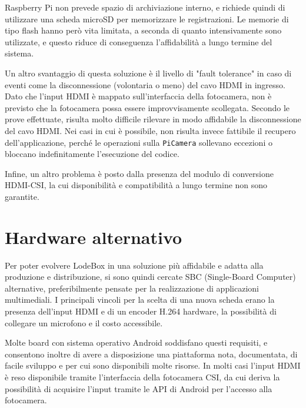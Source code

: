 
Raspberry Pi non prevede spazio di archiviazione interno, e richiede quindi di utilizzare una scheda microSD per memorizzare le registrazioni. Le memorie di tipo flash hanno però vita limitata, a seconda di quanto intensivamente sono utilizzate, e questo riduce di conseguenza l'affidabilità a lungo termine del sistema.

Un altro svantaggio di questa soluzione è il livello di "fault tolerance" in caso di eventi come la disconnessione (volontaria o meno) del cavo HDMI in ingresso. Dato che l'input HDMI è mappato sull'interfaccia della fotocamera, non è previsto che la fotocamera possa essere improvvisamente scollegata. Secondo le prove effettuate, risulta molto difficile rilevare in modo affidabile la disconnessione del cavo HDMI. Nei casi in cui è possibile, non risulta invece fattibile il recupero dell'applicazione, perché le operazioni sulla \texttt{PiCamera} sollevano eccezioni o bloccano indefinitamente l'esecuzione del codice.

Infine, un altro problema è posto dalla presenza del modulo di conversione HDMI-CSI, la cui disponibilità e compatibilità a lungo termine non sono garantite.

\section{Hardware alternativo}
\label{sec:intro_hardware}

Per poter evolvere LodeBox in una soluzione più affidabile e adatta alla produzione e distribuzione, si sono quindi cercate SBC (Single-Board Computer) alternative, preferibilmente pensate per la realizzazione di applicazioni multimediali. I principali vincoli per la scelta di una nuova scheda erano la presenza dell'input HDMI e di un encoder H.264 hardware, la possibilità di collegare un microfono e il costo accessibile.

Molte board con sistema operativo Android soddisfano questi requisiti, e consentono inoltre di avere a disposizione una piattaforma nota, documentata, di facile sviluppo e per cui sono disponibili molte risorse. In molti casi l'input HDMI è reso disponibile tramite l'interfaccia della fotocamera CSI, da cui deriva la possibilità di acquisire l'input tramite le API di Android per l'accesso alla fotocamera.

